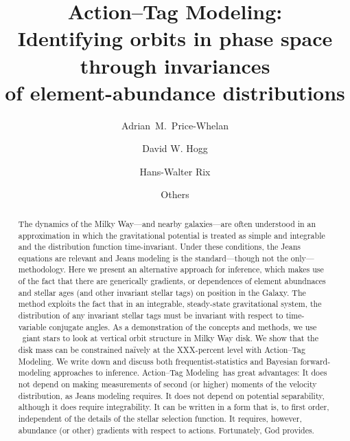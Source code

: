 \documentclass[modern]{aastex63}
\newcommand{\methodname}{Action--Tag Modeling}
\newcommand{\apogee}{\acronym{APOGEE}}
\begin{document}
\sloppy\sloppypar\raggedbottom\frenchspacing %
\graphicspath{ {figures/} }

\title{\textbf{%
\methodname:\\
Identifying orbits in phase space through invariances\\
of element-abundance distributions}}

\author[0000-0003-0872-7098]{Adrian~M.~Price-Whelan}

\author[0000-0003-2866-9403]{David W. Hogg}

\author[0000-0003-4996-9069]{Hans-Walter Rix}

\author{Others}

\begin{abstract}\noindent %
  The dynamics of the Milky Way---and nearby galaxies---are often
  understood in an approximation in which the gravitational potential
  is treated as simple and integrable and the distribution function
  time-invariant.
  Under these conditions, the Jeans equations are relevant and Jeans
  modeling is the standard---though not the only---methodology.
  Here we present an alternative approach for inference, which makes
  use of the fact that there are generically gradients, or dependences
  of element abundnaces and stellar ages (and other invariant stellar
  tags) on position in the Galaxy.
  The method exploits the fact that in an integrable, steady-state
  gravitational system, the distribution of any invariant stellar tags
  must be invariant with respect to time-variable conjugate angles.
  As a demonstration of the concepts and methods, we use
  \apogee\ giant stars to look at vertical orbit structure in Milky
  Way disk.
  We show that the disk mass can be constrained na\"ively at the
  XXX-percent level with \methodname.
  We write down and discuss both frequentist-statistics and Bayesian
  forward-modeling approaches to inference.
  \methodname\ has great advantages:
  It does not depend on making measurements of second (or higher)
  moments of the velocity distribution, as Jeans modeling
  requires.
  It does not depend on potential separability, although it does require
  integrability.
  It can be written in a form that is, to first order, independent
  of the details of the stellar selection function.
  It requires, however, abundance (or other) gradients with respect to actions.
  Fortunately, God provides.
\end{abstract}
\end{document}

